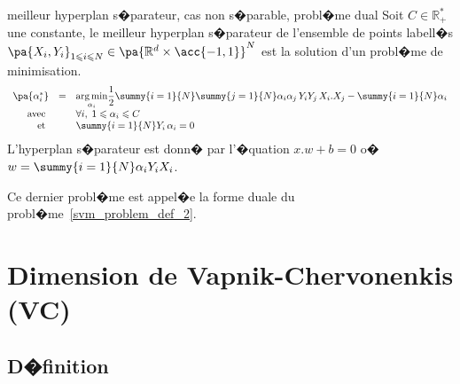             \begin{xproblem}{meilleur hyperplan s�parateur, cas non s�parable, probl�me dual}
            \label{svm_problem_def_2p}
            Soit $C \in \mathbb{R}^*_+$ une constante,
            le meilleur hyperplan s�parateur de l'ensemble de points labell�s
            $\pa{X_i,Y_i}_{1 \leqslant i \leqslant N} \in \pa{ \mathbb{R}^d \times \acc{-1,1} }^N$ est la solution
            d'un probl�me de minimisation. 
                    $$
                    \begin{array}{rcl}    \pa{\alpha_i^*} &=& \underset{\alpha_i}{\arg \min} \dfrac{1}{2}  
                                                                                    \summy{i=1}{N}\summy{j=1}{N}
                                                                                            \alpha_i \alpha_j \,
                                                                                            Y_i Y_j \,
                                                                                            X_i . X_j
                                                                                    - \summy{i=1}{N} \alpha_i \\
                                         \text{avec }      && \forall i, \; 1 \leqslant \alpha_i \leqslant C \\
                                         \text{et }          && \summy{i=1}{N} Y_i \, \alpha_i = 0
                    \end{array}                                        
                    $$
            L'hyperplan s�parateur est donn� par l'�quation $ x.w + b = 0$ o� 
            $w = \summy{i=1}{N} \alpha_i Y_i X_i$.
            \end{xproblem}

Ce dernier probl�me est appel�e la forme duale du probl�me~\ref{svm_problem_def_2}.

\section{Dimension de Vapnik-Chervonenkis (VC)}
\label{svm_dimension_vc}



\subsection{D�finition}

